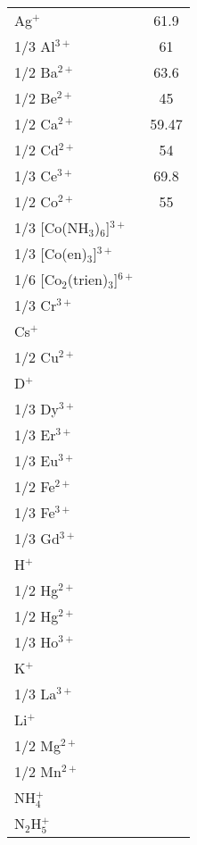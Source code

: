 \begin{table}[h!]
\begin{tabular}{|l|c|}
Ag$^+$ \dotfill & 61.9 \\
1/3 Al$^{3+}$ \dotfill& 61 \\
1/2 Ba$^{2+}$\dotfill& 63.6 \\
1/2 Be$^{2+}$\dotfill& 45 \\
1/2 Ca$^{2+}$\dotfill& 59.47 \\
1/2 Cd$^{2+}$\dotfill& 54 \\
1/3 Ce$^{3+}$\dotfill& 69.8 \\
1/2 Co$^{2+}$\dotfill& 55 \\
1/3 [Co(NH$_3$)$_6$]$^{3+}$\dotfill& \\
1/3 [Co(en)$_3$]$^{3+}$\dotfill& \\
1/6 [Co$_2$(trien)$_3$]$^{6+}$\dotfill& \\
1/3 Cr$^{3+}$\dotfill& \\
Cs$^+$\dotfill& \\
1/2 Cu$^{2+}$\dotfill& \\
D$^+$\dotfill& \\
1/3 Dy$^{3+}$\dotfill& \\
1/3 Er$^{3+}$\dotfill& \\
1/3 Eu$^{3+}$\dotfill& \\
1/2 Fe$^{2+}$\dotfill& \\
1/3 Fe$^{3+}$\dotfill& \\
1/3 Gd$^{3+}$\dotfill& \\
H$^+$\dotfill& \\
1/2 Hg$^{2+}$\dotfill& \\
1/2 Hg$^{2+}$\dotfill& \\
1/3 Ho$^{3+}$\dotfill& \\
K$^+$\dotfill& \\
1/3 La$^{3+}$\dotfill& \\
Li$^+$\dotfill& \\
1/2 Mg$^{2+}$\dotfill& \\
1/2 Mn$^{2+}$\dotfill& \\
NH$_4^{+}$\dotfill& \\
N$_2$H$_5^+$\dotfill& \\


\end{tabular}
\end{table}
